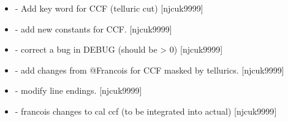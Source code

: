 \documentclass[a4paper,10pt,english]{report}
\begin{document}
\begin{itemize}
\item {} 
 - Add key word for CCF (telluric cut) {[}njcuk9999{]}

\item {} 
 - add new constants for CCF. {[}njcuk9999{]}

\item {} 
 - correct a bug in DEBUG (should be \textgreater{} 0)
{[}njcuk9999{]}

\item {} 
 - add changes from @Francois for CCF masked
by tellurics. {[}njcuk9999{]}

\item {} 
 - modify line endings. {[}njcuk9999{]}

\item {} 
 - francois changes to cal ccf (to be
integrated into  actual) {[}njcuk9999{]}

\end{itemize}
\end{document}
